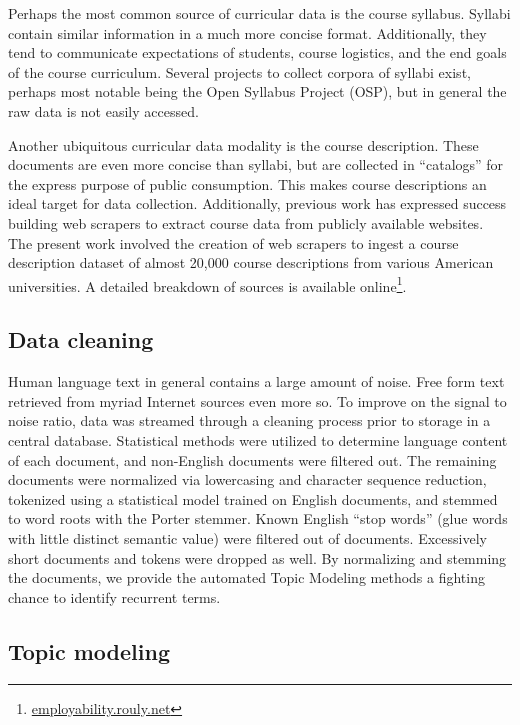 Perhaps the most common source of curricular data is the course syllabus.
Syllabi contain similar information in a much more concise format.
Additionally, they tend to communicate expectations of students, course logistics, and the end goals of the course curriculum.
Several projects to collect corpora of syllabi exist, perhaps most notable being the Open Syllabus Project (OSP), but in general the raw data is not easily accessed.

Another ubiquitous curricular data modality is the course description.
These documents are even more concise than syllabi, but are collected in ``catalogs'' for the express purpose of public consumption.
This makes course descriptions an ideal target for data collection.
Additionally, previous work has expressed success building web scrapers to extract course data from publicly available websites.~\cite{rouly2015}
The present work involved the creation of web scrapers to ingest a course description dataset of almost 20,000 course descriptions from various American universities.
A detailed breakdown of sources is available online\footnote{\href{http://employability.rouly.net}{employability.rouly.net}}.

\subsection{Data cleaning}

Human language text in general contains a large amount of noise.
Free form text retrieved from myriad Internet sources even more so.
To improve on the signal to noise ratio, data was streamed through a cleaning process prior to storage in a central database.
Statistical methods were utilized to determine language content of each document, and non-English documents were filtered out.
The remaining documents were normalized via lowercasing and character sequence reduction, tokenized using a statistical model trained on English documents, and stemmed to word roots with the Porter stemmer.
Known English ``stop words'' (glue words with little distinct semantic value) were filtered out of documents.
Excessively short documents and tokens were dropped as well.
By normalizing and stemming the documents, we provide the automated Topic Modeling methods a fighting chance to identify recurrent terms.

\subsection{Topic modeling}

